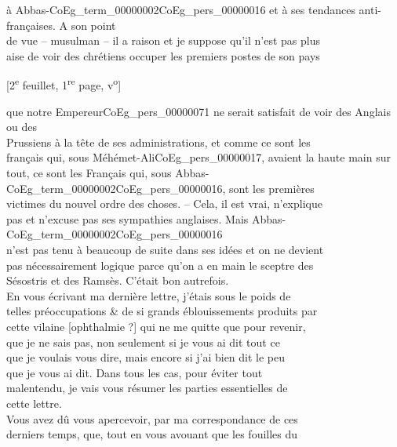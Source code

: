 \documentclass{book}
\begin{document}
à Abbas-\Gls{CoEg_term_00000002}\gls{CoEg_pers_00000016} et à ses tendances anti-françaises. A son point\\
de vue – musulman – il a raison et je suppose qu’il n’est pas plus\\
aise de voir des chrétiens occuper les premiers postes de son pays
{\footnotesize\begin{center} {[2\textsuperscript{e} feuillet, 1\textsuperscript{re} page, v\textsuperscript{o}]}\end{center}}
\noindent que notre Empereur\gls{CoEg_pers_00000071} ne serait satisfait de voir des Anglais ou des\\
Prussiens à la tête de ses administrations, et comme ce sont les\\
français qui, sous Méhémet-Ali\gls{CoEg_pers_00000017}, avaient la haute main sur\\
tout, ce sont les Français qui, sous Abbas-\Gls{CoEg_term_00000002}\gls{CoEg_pers_00000016}, sont les premières\\
victimes du nouvel ordre des choses. – Cela, il est vrai, n’explique\\
pas et n’excuse pas ses sympathies anglaises. Mais Abbas-\Gls{CoEg_term_00000002}\gls{CoEg_pers_00000016}\\
n’est pas tenu à beaucoup de suite dans ses idées et on ne devient\\
pas nécessairement logique parce qu’on a en main le sceptre des\\
Sésostris et des Ramsès. C’était bon autrefois.\\
\indent En vous écrivant ma dernière lettre, j’étais sous le poids de\\
telles préoccupations \& de si grands éblouissements produits par\\
cette vilaine {[ophthalmie ?]} qui ne me quitte que pour revenir,\\
que je ne sais pas, non seulement si je vous ai dit tout ce\\
que je voulais vous dire, mais encore si j’ai bien dit le peu\\
que je vous ai dit. Dans tous les cas, pour éviter tout\\
malentendu, je vais vous résumer les parties essentielles de\\
cette lettre.\\
\indent Vous avez dû vous apercevoir, par ma correspondance de ces\\
derniers temps, que, tout en vous avouant que les fouilles du\\
\end{document}
